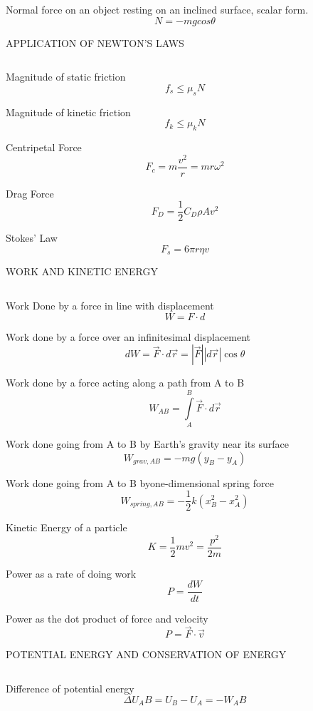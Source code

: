 \documentclass[12pt, letterpaper, twoside]{article}
\begin{document}
Normal force on an object resting on an inclined surface,
scalar form.
$$N = -m g cos \theta$$



\newpage

APPLICATION OF NEWTON'S LAWS

$$ $$

Magnitude of static friction
$$f_s \leq \mu_s N$$


Magnitude of kinetic friction
$$f_k \leq \mu_k N$$


Centripetal Force
$$F_c = m \frac{v^2}{r} = mr\omega^2$$



Drag Force
$$F_D=\frac{1}{2} C_D \rho A v^2 $$


Stokes' Law
$$F_s = 6 \pi r \eta v $$








\newpage

WORK AND KINETIC ENERGY

$$ $$


Work Done by a force in line with displacement
$$ W = F \cdot d $$


Work done by a force over an infinitesimal displacement
$$ dW = \overrightarrow{F} \cdot d \overrightarrow{r} = | \overrightarrow{F} | | d \overrightarrow{r} | \cos \theta $$


Work done by a force acting along a path from A to B
$$ W_{AB} = \int\limits_A^B \overrightarrow{F} \cdot d \overrightarrow{r} $$


Work done going from A to B by Earth's gravity near its surface
$$ W_{grav,AB} = -mg(y_B - y_A) $$


Work done going from A to B byone-dimensional spring force
$$ W_{spring,AB} = - \frac{1}{2} k (x_B^2 - x_A^2) $$


Kinetic Energy of a particle
$$ K = \frac{1}{2} m v^2 = \frac{p^2}{2m} $$


Power as a rate of doing work
$$ P = \frac{dW}{dt} $$


Power as the dot product of force and velocity
$$ P = \overrightarrow{F} \cdot \overrightarrow{v} $$



\newpage

POTENTIAL ENERGY AND CONSERVATION OF ENERGY

$$ $$

Difference of potential energy
$$ \Delta U_AB = U_B - U_A = -W_AB $$
\end{document}
